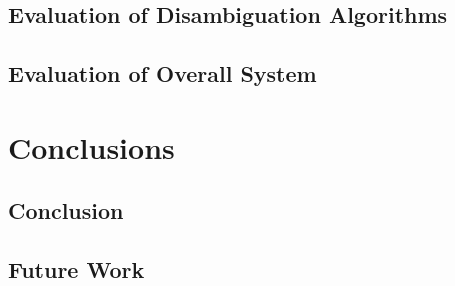\documentclass[12pt, a4paper]{report}
\begin{document}
\section{Evaluation of Disambiguation Algorithms}


\section{Evaluation of Overall System}


\chapter{Conclusions}

\section{Conclusion}

\section{Future Work}




\end{document}
